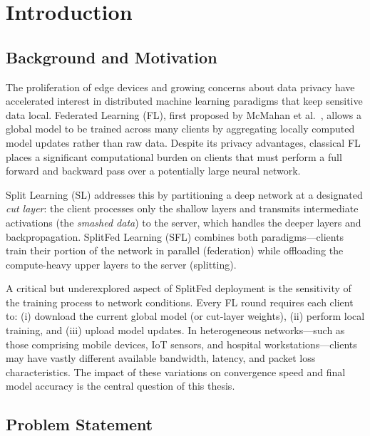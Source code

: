 \documentclass[12pt,a4paper]{report}
\begin{document}
\tableofcontents
\listoffigures
\listoftables

\chapter{Introduction}

\section{Background and Motivation}

The proliferation of edge devices and growing concerns about data privacy have accelerated interest in distributed machine learning paradigms that keep sensitive data local. Federated Learning (FL), first proposed by McMahan et al.\ \cite{mcmahan2017communication}, allows a global model to be trained across many clients by aggregating locally computed model updates rather than raw data. Despite its privacy advantages, classical FL places a significant computational burden on clients that must perform a full forward and backward pass over a potentially large neural network.

Split Learning (SL) \cite{gupta2018distributed} addresses this by partitioning a deep network at a designated \emph{cut layer}: the client processes only the shallow layers and transmits intermediate activations (the \emph{smashed data}) to the server, which handles the deeper layers and backpropagation. SplitFed Learning (SFL) \cite{thapa2022splitfed} combines both paradigms—clients train their portion of the network in parallel (federation) while offloading the compute-heavy upper layers to the server (splitting).

A critical but underexplored aspect of SplitFed deployment is the sensitivity of the training process to network conditions. Every FL round requires each client to: (i) download the current global model (or cut-layer weights), (ii) perform local training, and (iii) upload model updates. In heterogeneous networks—such as those comprising mobile devices, IoT sensors, and hospital workstations—clients may have vastly different available bandwidth, latency, and packet loss characteristics. The impact of these variations on convergence speed and final model accuracy is the central question of this thesis.

\section{Problem Statement}
\end{document}
